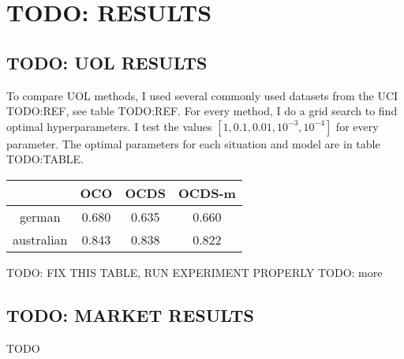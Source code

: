 \chapter{TODO: RESULTS}

\section{TODO: UOL RESULTS}

To compare UOL methods, I used several commonly used datasets from the UCI
TODO:REF, see table TODO:REF. For every method, I do a grid search to find
optimal hyperparameters. I test the values $[1,0.1,0.01,10^{-3},10^{-4}]$ for
every parameter. The optimal parameters for each situation and model are in table
TODO:TABLE.
\begin{table}
    \begin{tabular}{c|c|c|c}
               & OCO   & OCDS & OCDS-m \\
        \hline
        german & 0.680                 %
               & 0.635                 %
               & 0.660                 %
        \\ australian & 0.843                 %
               & 0.838                 %
               & 0.822                 %
    \end{tabular}
\end{table}
TODO: FIX THIS TABLE, RUN EXPERIMENT PROPERLY
TODO: more

\section{TODO: MARKET RESULTS}
TODO